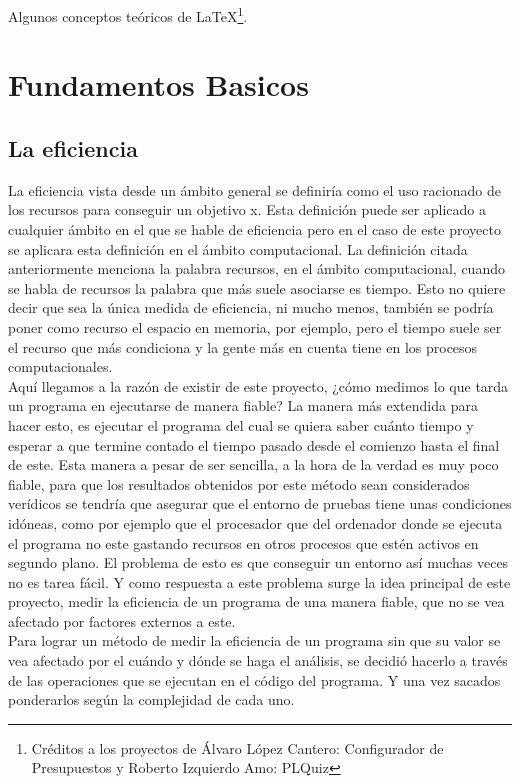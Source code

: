 

Algunos conceptos teóricos de \LaTeX \footnote{Créditos a los proyectos de Álvaro López Cantero: Configurador de Presupuestos y Roberto Izquierdo Amo: PLQuiz}.

\section{Fundamentos Basicos}

\subsection{La eficiencia}

La eficiencia vista desde un ámbito general se definiría como el uso racionado de los recursos para conseguir un objetivo x. Esta definición puede ser aplicado a cualquier ámbito en el que se hable de eficiencia pero en el caso de este proyecto se aplicara esta definición en el ámbito computacional.
La definición citada anteriormente menciona la palabra recursos, en el ámbito computacional, cuando se habla de recursos la palabra que más suele asociarse es tiempo. Esto no quiere decir que sea la única medida de eficiencia, ni mucho menos, también se podría poner como recurso el espacio en memoria, por ejemplo, pero el tiempo suele ser el recurso que más condiciona y la gente más en cuenta tiene en los procesos computacionales.\\
Aquí llegamos a la razón de existir de este proyecto, ¿cómo medimos lo que tarda un programa en ejecutarse de manera fiable? La manera más extendida para hacer esto, es ejecutar el programa del cual se quiera saber cuánto tiempo y esperar a que termine contado el tiempo pasado desde el comienzo hasta el final de este. Esta manera a pesar de ser sencilla, a la hora de la verdad es muy poco fiable, para que los resultados obtenidos por este método sean considerados verídicos se tendría que asegurar que el entorno de pruebas tiene unas condiciones idóneas, como por ejemplo que el procesador que del ordenador donde se ejecuta el programa no este gastando recursos en otros procesos que estén activos en segundo plano. El problema de esto es que conseguir un entorno así muchas veces no es tarea fácil. Y como respuesta a este problema surge la idea principal de este proyecto, medir la eficiencia de un programa de una manera fiable, que no se vea afectado por factores externos a este.\\
Para lograr un método de medir la eficiencia de un programa sin que su valor se vea afectado por el cuándo y dónde se haga el análisis, se decidió hacerlo a través de las operaciones que se ejecutan en el código del programa. Y una vez sacados ponderarlos según la complejidad de cada uno. 

